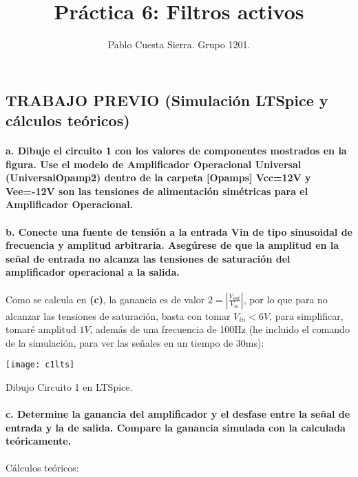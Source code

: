 \documentclass{article}
\title{Práctica 6: Filtros activos}
\date{}
\author{Pablo Cuesta Sierra. Grupo 1201.}
\begin{document}
\maketitle
\begin{center}
\section{TRABAJO PREVIO (Simulación LTSpice y cálculos teóricos)}
\end{center}
\paragraph{a. Dibuje el circuito 1 con los valores de componentes mostrados en la figura. Use el modelo de  Amplificador  Operacional  Universal  (UniversalOpamp2) dentro  de  la  carpeta  [Opamps] Vcc=12V  y  Vee=-12V  son  las  tensiones  de  alimentación  simétricas  para  el  Amplificador Operacional.}

\paragraph{b. Conecte una fuente de tensión a la entrada Vin de tipo sinusoidal de frecuencia y amplitud arbitraria. Asegúrese  de  que  la  amplitud  en  la  señal  de  entrada  no  alcanza  las  tensiones  de saturación del amplificador operacional a la salida.\\}

Como se calcula en \textbf{(c)}, la ganancia es de valor $2=|\frac{V_{out}}{V_{in}}|$, por lo que para no alcanzar las tensiones de saturación, basta con tomar $V_{in}<6V$, para simplificar, tomaré amplitud $1V$, además de una frecuencia de 100Hz (he incluido el comando de la simulación, para ver las señales en un tiempo de 30ms):
\bigskip
\begin{center}
\centerline{\texttt{[image: c1lts]}}
{Dibujo Circuito 1 en LTSpice.}
\label{fig1}
\end{center}
\cleardoublepage

\paragraph{c. Determine la ganancia del amplificador y el desfase entre la señal de entrada y la de salida. Compare la ganancia simulada con la calculada teóricamente.\\}



Cálculos teóricos:
\end{document}
